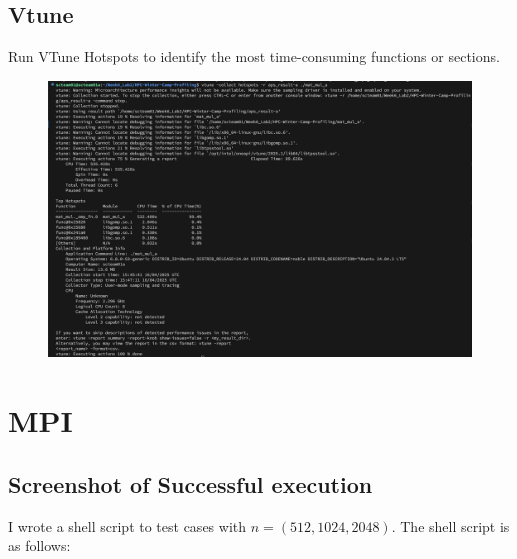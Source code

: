 \documentclass{article}
\begin{document}
\clearpage

\subsection*{Vtune}

Run VTune Hotspots to identify the most time-consuming functions or sections.

\begin{figure}[htbp]
    \centering
    \includegraphics[width=1\textwidth]{./img/q1-8.png}
\end{figure}

\section*{MPI}

\subsection*{Screenshot of Successful execution}

I wrote a shell script to test cases with $n = (512, 1024, 2048)$. The shell script is as follows:
\end{document}
